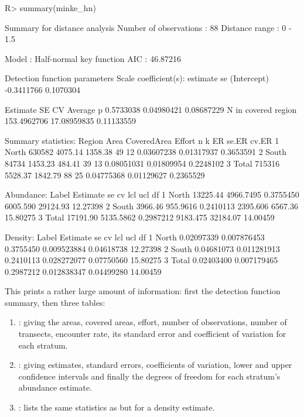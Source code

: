 \documentclass[article,shortnames]{jss}
\providecommand{\tightlist}{%
  \setlength{\itemsep}{0pt}\setlength{\parskip}{0pt}}
\begin{document}
\begin{CodeChunk}
\begin{CodeInput}
R> summary(minke_hn)
\end{CodeInput}
\begin{CodeOutput}

Summary for distance analysis 
Number of observations :  88 
Distance range         :  0  -  1.5 

Model : Half-normal key function 
AIC   : 46.87216 

Detection function parameters
Scale coefficient(s):  
              estimate        se
(Intercept) -0.3411766 0.1070304

                       Estimate          SE         CV
Average p             0.5733038  0.04980421 0.08687229
N in covered region 153.4962706 17.08959835 0.11133559

Summary statistics:
  Region   Area CoveredArea  Effort  n  k         ER      se.ER     cv.ER
1  North 630582     4075.14 1358.38 49 12 0.03607238 0.01317937 0.3653591
2  South  84734     1453.23  484.41 39 13 0.08051031 0.01809954 0.2248102
3  Total 715316     5528.37 1842.79 88 25 0.04775368 0.01129627 0.2365529

Abundance:
  Label Estimate        se        cv      lcl      ucl       df
1 North 13225.44 4966.7495 0.3755450 6005.590 29124.93 12.27398
2 South  3966.46  955.9616 0.2410113 2395.606  6567.36 15.80275
3 Total 17191.90 5135.5862 0.2987212 9183.475 32184.07 14.00459

Density:
  Label   Estimate          se        cv         lcl        ucl       df
1 North 0.02097339 0.007876453 0.3755450 0.009523884 0.04618738 12.27398
2 South 0.04681073 0.011281913 0.2410113 0.028272077 0.07750560 15.80275
3 Total 0.02403400 0.007179465 0.2987212 0.012838347 0.04499280 14.00459
\end{CodeOutput}
\end{CodeChunk}

This prints a rather large amount of information: first the detection
function summary, then three tables:

\begin{enumerate}
\def\labelenumi{\arabic{enumi}.}
\tightlist
\item
  : giving the areas, covered areas, effort,
  number of observations, number of transects, encounter rate, its
  standard error and coefficient of variation for each stratum.
\item
  : giving estimates, standard errors, coefficients of
  variation, lower and upper confidence intervals and finally the
  degrees of freedom for each stratum's abundance estimate.
\item
  : lists the same statistics as  but for
  a density estimate.
\end{enumerate}
\end{document}
